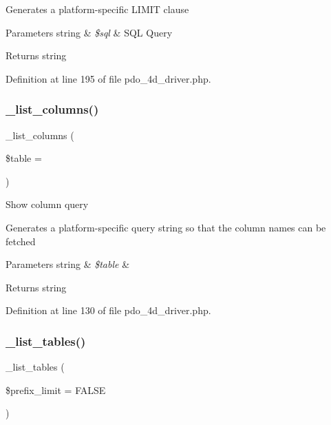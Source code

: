 Generates a platform-\/specific L\+I\+M\+IT clause


\begin{DoxyParams}[1]{Parameters}
string & {\em \$sql} & S\+QL Query \\
\hline
\end{DoxyParams}
\begin{DoxyReturn}{Returns}
string 
\end{DoxyReturn}


Definition at line 195 of file pdo\+\_\+4d\+\_\+driver.\+php.

\mbox{\label{class_c_i___d_b__pdo__4d__driver_a7ccb7f9c301fe7f0a9db701254142b63}} 
\subsubsection{\texorpdfstring{\_list\_columns()}{\_list\_columns()}}
{\footnotesize\ttfamily \+\_\+list\+\_\+columns (\begin{DoxyParamCaption}\item[{}]{\$table = {\ttfamily \textquotesingle{}\textquotesingle{}} }\end{DoxyParamCaption})\hspace{0.3cm}{\ttfamily [protected]}}

Show column query

Generates a platform-\/specific query string so that the column names can be fetched


\begin{DoxyParams}[1]{Parameters}
string & {\em \$table} & \\
\hline
\end{DoxyParams}
\begin{DoxyReturn}{Returns}
string 
\end{DoxyReturn}


Definition at line 130 of file pdo\+\_\+4d\+\_\+driver.\+php.

\mbox{\label{class_c_i___d_b__pdo__4d__driver_a435c0f3ce54fe7daa178baa8532ebd54}} 
\subsubsection{\texorpdfstring{\_list\_tables()}{\_list\_tables()}}
{\footnotesize\ttfamily \+\_\+list\+\_\+tables (\begin{DoxyParamCaption}\item[{}]{\$prefix\+\_\+limit = {\ttfamily FALSE} }\end{DoxyParamCaption})\hspace{0.3cm}{\ttfamily [protected]}}

